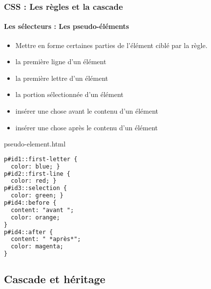 \documentclass[xcolor=table]{beamer}
\begin{document}
\begin{frame}[fragile]
\frametitle{CSS : Les règles et la cascade}
\framesubtitle{Les sélecteurs : Les pseudo-éléments}

\begin{minipage}{0.60\textwidth} 
	\begin{itemize}
		\item Mettre en forme certaines parties de l'élément ciblé par la règle.
		\item {} la première ligne d'un élément
		\item {} la première lettre d'un élément
		\item {} la portion sélectionnée d'un élément
		\item {} insérer une chose avant le contenu d'un élément
		\item {} insérer une chose après le contenu d'un élément
	\end{itemize}
\end{minipage}
%
\begin{minipage}{0.38\textwidth}
\begin{block}{pseudo-element.html}
\lstset{escapeinside=**}
\scriptsize\bfseries
\begin{lstlisting}[language={html}]
p#id1::first-letter {
  color: blue; }
p#id2::first-line {
  color: red; }
p#id3::selection {
  color: green; }
p#id4::before {
  content: "avant ";
  color: orange;
}
p#id4::after {
  content: " *après*";
  color: magenta;
}
\end{lstlisting}
\end{block}
\end{minipage}
\end{frame}

\subsection{Cascade et héritage}

%
%
\end{document}
